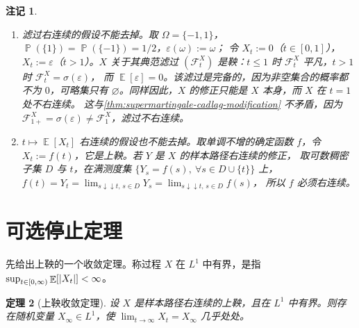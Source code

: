 \documentclass[UTF8,11pt,a4paper,oneside,fontset=fandol]{ctexrep}
\numberwithin{equation}{section}
\theoremstyle{zhthm}
\newtheorem{theorem}{定理}[section]
\newtheorem{remark}[theorem]{注记}
\newcommand{\F}{\mathcal{F}}
\DeclareMathOperator{\Prob}{\mathbb{P}}
\DeclareMathOperator{\E}{\mathbb{E}}
\DeclarePairedDelimiter{\abs}{\lvert}{\rvert}
\begin{document}
\begin{remark}
\label{rem:cadlag-modification-assumptions}
\begin{enumerate}[label=(\arabic*)]
  \item 滤过右连续的假设不能去掉。取 $\Omega=\{-1,1\}$，$\Prob(\{1\})=\Prob(\{-1\})=1/2$，$\varepsilon(\omega):=\omega$；
    令 $X_t:=0$（$t\in[0,1]$），$X_t:=\varepsilon$（$t>1$）。$X$ 关于其典范滤过 $(\F^X_t)$ 是鞅：$t\le1$ 时 $\F^X_t$ 平凡，$t>1$ 时 $\F^X_t=\sigma(\varepsilon)$，
    而 $\E[\varepsilon]=0$。该滤过是完备的，因为非空集合的概率都不为 $0$，可略集只有 $\varnothing$。同样因此，$X$ 的修正只能是 $X$ 本身，而 $X$ 在 $t=1$ 处不右连续。
    这与\cref{thm:supermartingale-cadlag-modification} 不矛盾，因为 $\F^X_{1+}=\sigma(\varepsilon)\ne\F^X_1$，滤过不右连续。
  \item $t\mapsto\E[X_t]$ 右连续的假设也不能去掉。取单调不增的确定函数 $f$，令 $X_t:=f(t)$，它是上鞅。若 $Y$ 是 $X$ 的样本路径右连续的修正，
    取可数稠密子集 $D$ 与 $t$，在满测度集 $\{Y_s=f(s),\ \forall s\in D\cup\{t\}\}$ 上，$f(t)=Y_t=\lim_{s\downarrow\downarrow t,\,s\in D}Y_s=\lim_{s\downarrow\downarrow t,\,s\in D}f(s)$，
    所以 $f$ 必须右连续。
\end{enumerate}
\end{remark}

\section{可选停止定理}
\label{sec:optional-stopping}

先给出上鞅的一个收敛定理。称过程 $X$ 在 $L^1$ 中有界，是指 $\sup_{t\in[0,\infty)}\E[\abs{X_t}]<\infty$。

\begin{theorem}[上鞅收敛定理]
\label{thm:supermartingale-convergence}
设 $X$ 是样本路径右连续的上鞅，且在 $L^1$ 中有界。则存在随机变量 $X_\infty\in L^1$，使 $\lim_{t\to\infty}X_t=X_\infty$ 几乎处处。
\end{theorem}
\end{document}
